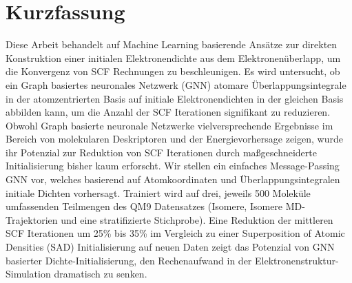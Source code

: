 \chapter*{Kurzfassung}

Diese Arbeit behandelt auf Machine Learning basierende Ansätze zur direkten Konstruktion einer initialen Elektronendichte aus dem Elektronenüberlapp, um die Konvergenz von SCF Rechnungen zu beschleunigen. Es wird untersucht, ob ein Graph basiertes neuronales Netzwerk (GNN) atomare Überlappungsintegrale in der atomzentrierten Basis auf initiale Elektronendichten in der gleichen Basis abbilden kann, um die Anzahl der SCF Iterationen signifikant zu reduzieren. Obwohl Graph basierte neuronale Netzwerke vielversprechende Ergebnisse im Bereich von molekularen Deskriptoren und der Energievorhersage zeigen, wurde ihr Potenzial zur Reduktion von SCF Iterationen durch maßgeschneiderte Initialisierung bisher kaum erforscht. Wir stellen ein einfaches Message-Passing GNN vor, welches basierend auf Atomkoordinaten und Überlappungsintegralen initiale Dichten vorhersagt. Trainiert wird auf drei, jeweils 500 Moleküle umfassenden Teilmengen des QM9 Datensatzes (Isomere, Isomere MD-Trajektorien und eine stratifizierte Stichprobe). Eine Reduktion der mittleren SCF Iterationen um 25\% bis 35\% im Vergleich zu einer Superposition of Atomic Densities (SAD) Initialisierung auf neuen Daten zeigt das Potenzial von GNN basierter Dichte-Initialisierung, den Rechenaufwand in der Elektronenstruktur-Simulation dramatisch zu senken.